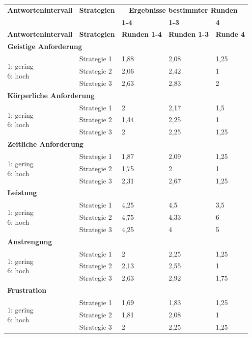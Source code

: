 \documentclass[12pt,a4paper]{scrartcl}
\begin{document}
\begin{longtable}{|p{4cm}|p{2cm}|p{2cm}|p{2cm}|p{2cm}|}
	\hline
		\textbf{Antwortenintervall}&\textbf{Strategien}&\multicolumn{3}{c|}{\textbf{Ergebnisse bestimmter Runden}}\\
	&&\textbf{1-4}&\textbf{1-3} &\textbf{4}\\
	\hline
	\endfirsthead
	\hline
	\textbf{Antwortenintervall}&\textbf{Strategien}&\textbf{Runden 1-4}&\textbf{Runden 1-3} &\textbf{Runde 4}\\
	\hline
	\endhead
		\multicolumn{5}{l}{\textbf{Geistige Anforderung}}\\
		\hline
\multirow{3}{4cm}{1: gering \newline 6: hoch} & Strategie 1 &  1,88 & 2,08 & 1,25 \\
 & Strategie 2 & 2,06 & 2,42 & 1\\
 & Strategie 3 & 2,63 & 2,83 & 2 \\
\hline
		\multicolumn{5}{l}{\textbf{Körperliche Anforderung}}\\
		\hline
\multirow{3}{4cm}{1: gering \newline 6: hoch} & Strategie 1 & 2 & 2,17 & 1,5 \\
 & Strategie 2 & 1,44 & 2,25 & 1 \\
 & Strategie 3 & 2 & 2,25 & 1,25 \\
\hline
		\multicolumn{5}{l}{\textbf{Zeitliche Anforderung}}\\
		\hline
\multirow{3}{4cm}{1: gering \newline 6: hoch} & Strategie 1 & 1,87 & 2,09 & 1,25 \\
 & Strategie 2 & 1,75 & 2 & 1 \\
 & Strategie 3 & 2,31 & 2,67 & 1,25 \\
\hline
		\multicolumn{5}{l}{\textbf{Leistung}}\\
		\hline
\multirow{3}{4cm}{1: gering \newline 6: hoch} & Strategie 1 & 4,25 & 4,5 & 3,5 \\
 & Strategie 2 & 4,75 & 4,33 & 6 \\
 & Strategie 3 & 4,25 & 4 & 5 \\
\hline
		\multicolumn{5}{l}{\textbf{Anstrengung}}\\
		\hline
\multirow{3}{4cm}{1: gering \newline 6: hoch} & Strategie 1 & 2 & 2,25 & 1,25 \\
 & Strategie 2 & 2,13 & 2,55 & 1 \\
 & Strategie 3 & 2,63 & 2,92 & 1,75\\
\hline
		\multicolumn{5}{l}{\textbf{Frustration}}\\
		\hline
\multirow{3}{4cm}{1: gering \newline 6: hoch} & Strategie 1 & 1,69 & 1,83 & 1,25 \\
 & Strategie 2 & 1,81 & 2,08 & 1 \\
 & Strategie 3 & 2 & 2,25 & 1,25 \\
\hline
\end{longtable}
\end{document}
